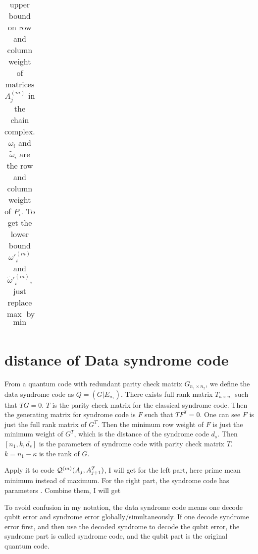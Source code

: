 \documentclass[aps,prb,12pt,tightenlines,%
notitlepage,longbibliography]{revtex4-1}
\begin{document}
\begin{table}[htbp]
\begin{tabular}[c]{c||c|c|c|c}
\end{tabular}
  \caption{upper bound on row and column weight of matrices $A^{(m)}_j$ in the chain complex. $\omega_i$ and $\tilde\omega_i$ are the row and column weight of $P_i$.  To get the lower bound $\omega'^{(m)}_i$ and $\tilde\omega'^{(m)}_i$, just replace $\max$ by $\min$
  }
  \label{tab:weight}
\end{table}


\section{distance of Data syndrome code}
From a quantum code with redundant parity check matrix $G_{n_1 \times n_2}$, we define the data syndrome code as $Q=( G|E_{n_1} )$. There exists full rank matrix $T_{\kappa \times n_1}$ such that $TG=0$. $T$ is the parity check matrix for the classical syndrome code. Then the generating matrix for syndrome code is $F$ such that $TF^T=0$. One can see $F$ is just the full rank matrix of $G^T$. Then the minimum row weight of $F$ is just the minimum weight of $G^T$, which is the distance of the syndrome code $d_s$. Then $[n_1,k,d_s]$ is the parameters of syndrome code with parity check matrix $T$. $k=n_1-\kappa$ is the rank of $G$.

Apply it to code $ {\cal Q}^{(m)}(A_{j},A_{j+1}^T)$, I will get  for the left part, here prime mean minimum instead of maximum. For the right part, the syndrome code has parameters  . Combine them, I will get  

To avoid confusion in my notation, the data syndrome code means one decode qubit error and syndrome error globally/simultaneously. If one decode syndrome error first, and then use the decoded syndrome to decode the qubit error,  the syndrome part is called syndrome code, and the qubit part is the original quantum code.
\end{document}
